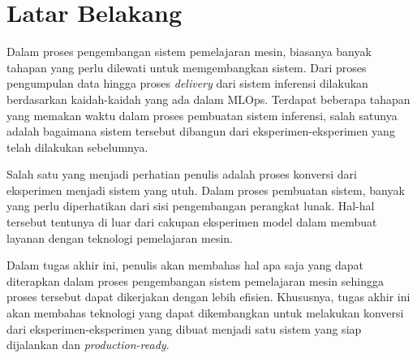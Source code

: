 \section{Latar Belakang}

Dalam proses pengembangan sistem pemelajaran mesin, biasanya banyak tahapan yang perlu dilewati untuk memgembangkan sistem.
Dari proses pengumpulan data hingga proses \textit{delivery} dari sistem inferensi dilakukan berdasarkan kaidah-kaidah yang ada dalam MLOps.
Terdapat beberapa tahapan yang memakan waktu dalam proses pembuatan sistem inferensi, salah satunya adalah bagaimana sistem tersebut dibangun dari eksperimen-eksperimen yang telah dilakukan sebelumnya.

Salah satu yang menjadi perhatian penulis adalah proses konversi dari eksperimen menjadi sistem yang utuh.
Dalam proses pembuatan sistem, banyak yang perlu diperhatikan dari sisi pengembangan perangkat lunak.
Hal-hal tersebut tentunya di luar dari cakupan eksperimen model dalam membuat layanan dengan teknologi pemelajaran mesin.

Dalam tugas akhir ini, penulis akan membahas hal apa saja yang dapat diterapkan dalam proses pengembangan sistem pemelajaran mesin sehingga proses tersebut dapat dikerjakan dengan lebih efisien.
Khususnya, tugas akhir ini akan membahas teknologi yang dapat dikembangkan untuk melakukan konversi dari eksperimen-eksperimen yang dibuat menjadi satu sistem yang siap dijalankan dan \textit{production-ready}.